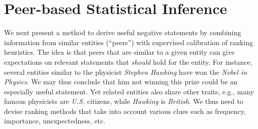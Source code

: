 \section{Peer-based Statistical Inference}
\label{sec:inference}
We next present a method to derive useful negative statements by combining information from similar entities (``peers'') with supervised calibration of ranking heuristics. The idea is that peers that are similar to a given entity can give expectations on relevant statements that \textit{should} hold for the entity. For instance, several entities similar to the physicist \emph{Stephen Hawking} have won the \textit{Nobel in Physics}. We may thus conclude that him not winning this prize could be an especially useful statement. Yet related entities also share other traits, e.g., many famous physicists are \textit{U.S.} citizens, while \textit{Hawking} is \textit{British}. We thus need to devise ranking methods that take into account various clues such as frequency, importance, unexpectedness, etc.\\

